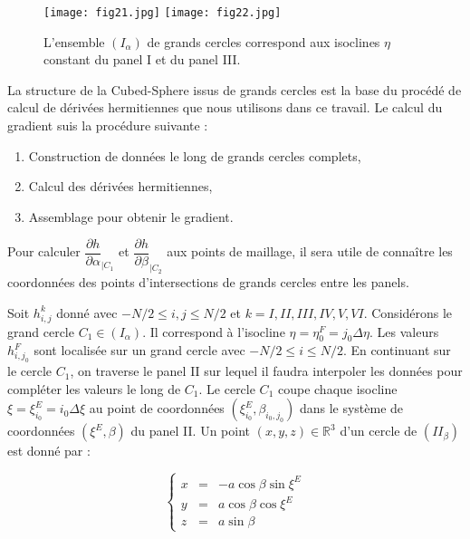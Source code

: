 \begin{figure}
\begin{center}
\texttt{[image: fig21.jpg]}
\texttt{[image: fig22.jpg]}
\end{center}
\caption{L'ensemble $(I_{\alpha})$ de grands cercles correspond aux isoclines $\eta$ constant du panel I et du panel III.}
\end{figure}


La structure de la Cubed-Sphere issus de grands cercles est la base du procédé de calcul de dérivées hermitiennes que nous utilisons dans ce travail. Le calcul du gradient suis la procédure suivante :

\begin{enumerate}
\item Construction de données le long de grands cercles complets,
\item Calcul des dérivées hermitiennes,
\item Assemblage pour obtenir le gradient.
\end{enumerate}




Pour calculer $\dfrac{\partial h}{\partial \alpha}_{|C_1}$ et $\dfrac{\partial h}{\partial \beta}_{|C_2}$ aux points de maillage, il sera utile de connaître les coordonnées des points d'intersections de grands cercles entre les panels.

Soit $h_{i,j}^k$ donné avec $-N/2 \leq i,j \leq N/2$ et $k = I, II, III, IV, V, VI$. Considérons le grand cercle $C_1 \in (I_{\alpha})$. Il correspond à l'isocline $\eta = \eta_0^F = j_0 \Delta \eta$. Les valeurs $h_{i,j_0}^F$ sont localisée sur un grand cercle avec $-N/2 \leq i \leq N/2$. En continuant sur le cercle $C_1$, on traverse le panel II sur lequel il faudra interpoler les données pour compléter les valeurs le long de $C_1$. Le cercle $C_1$ coupe chaque isocline $\xi = \xi^E_{i_0} = i_0 \Delta \xi$ au point de coordonnées $(\xi_{i_0}^E, \beta_{i_0,j_0})$ dans le système de coordonnées $(\xi^E, \beta)$ du panel II. Un point $(x,y,z)\in \mathbb{R}^3$ d'un cercle de $(II_{\beta})$ est donné par :

\begin{equation}
\left\lbrace
\begin{array}{rcl}
x & = & - a \cos \beta \sin \xi^E \\
y & = & a \cos \beta \cos \xi^E \\
z & = & a \sin \beta
\end{array}
\right.
\end{equation}

